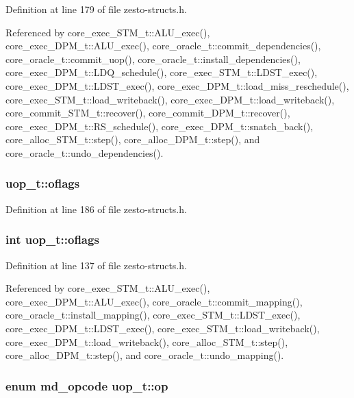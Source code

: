 Definition at line 179 of file zesto-structs.h.

Referenced by core\_\-exec\_\-STM\_\-t::ALU\_\-exec(), core\_\-exec\_\-DPM\_\-t::ALU\_\-exec(), core\_\-oracle\_\-t::commit\_\-dependencies(), core\_\-oracle\_\-t::commit\_\-uop(), core\_\-oracle\_\-t::install\_\-dependencies(), core\_\-exec\_\-DPM\_\-t::LDQ\_\-schedule(), core\_\-exec\_\-STM\_\-t::LDST\_\-exec(), core\_\-exec\_\-DPM\_\-t::LDST\_\-exec(), core\_\-exec\_\-DPM\_\-t::load\_\-miss\_\-reschedule(), core\_\-exec\_\-STM\_\-t::load\_\-writeback(), core\_\-exec\_\-DPM\_\-t::load\_\-writeback(), core\_\-commit\_\-STM\_\-t::recover(), core\_\-commit\_\-DPM\_\-t::recover(), core\_\-exec\_\-DPM\_\-t::RS\_\-schedule(), core\_\-exec\_\-DPM\_\-t::snatch\_\-back(), core\_\-alloc\_\-STM\_\-t::step(), core\_\-alloc\_\-DPM\_\-t::step(), and core\_\-oracle\_\-t::undo\_\-dependencies().
\subsubsection[{oflags}]{ {\bf uop\_\-t::oflags}}\label{structuop__t_caa3129abac823fa23c45d7ccfd37357}




Definition at line 186 of file zesto-structs.h.
\subsubsection[{oflags}]{\setlength{\rightskip}{0pt plus 5cm}int {\bf uop\_\-t::oflags}}\label{structuop__t_a0d602d55a295c1e2b230d66190f5fc7}




Definition at line 137 of file zesto-structs.h.

Referenced by core\_\-exec\_\-STM\_\-t::ALU\_\-exec(), core\_\-exec\_\-DPM\_\-t::ALU\_\-exec(), core\_\-oracle\_\-t::commit\_\-mapping(), core\_\-oracle\_\-t::install\_\-mapping(), core\_\-exec\_\-STM\_\-t::LDST\_\-exec(), core\_\-exec\_\-DPM\_\-t::LDST\_\-exec(), core\_\-exec\_\-STM\_\-t::load\_\-writeback(), core\_\-exec\_\-DPM\_\-t::load\_\-writeback(), core\_\-alloc\_\-STM\_\-t::step(), core\_\-alloc\_\-DPM\_\-t::step(), and core\_\-oracle\_\-t::undo\_\-mapping().
\subsubsection[{op}]{\setlength{\rightskip}{0pt plus 5cm}enum {\bf md\_\-opcode} {\bf uop\_\-t::op}}\label{structuop__t_c1fb2c48a0b03eafe8596e3b134042f4}




